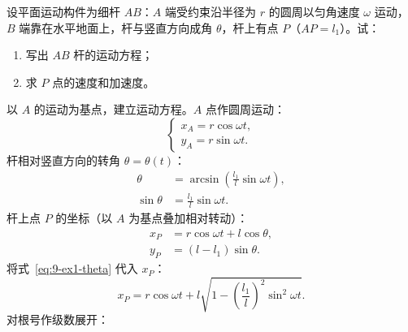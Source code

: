 \begin{example}
设平面运动构件为细杆 $AB$：$A$ 端受约束沿半径为 $r$ 的圆周以匀角速度 $\omega$ 运动，$B$ 端靠在水平地面上，杆与竖直方向成角 $\theta$，杆上有点 $P$（$AP=l_1$）。试：
\begin{enumerate}
  \item 写出 $AB$ 杆的运动方程；
  \item 求 $P$ 点的速度和加速度。
\end{enumerate}

\begin{solution}
以 $A$ 的运动为基点，建立运动方程。$A$ 点作圆周运动：
\begin{equation}\label{eq:9-ex1-A}
  \begin{cases}
    x_A = r\cos\omega t,\\
    y_A = r\sin\omega t.
  \end{cases}
\end{equation}
杆相对竖直方向的转角 $\theta=\theta(t)$：
\begin{equation}\label{eq:9-ex1-theta}
  \begin{aligned}
    \theta &= \arcsin\!\left(\frac{l_1}{l}\sin\omega t\right),\\
    \sin\theta &= \frac{l_1}{l}\sin\omega t.
  \end{aligned}
\end{equation}
杆上点 $P$ 的坐标（以 $A$ 为基点叠加相对转动）：
\begin{equation}\label{eq:9-ex1-P}
  \begin{aligned}
    x_P &= r\cos\omega t + l\cos\theta,\\
    y_P &= (l-l_1)\sin\theta.
  \end{aligned}
\end{equation}
将式~\eqref{eq:9-ex1-theta} 代入 $x_P$：
\begin{equation}\label{eq:9-ex1-Pexact}
  x_P = r\cos\omega t + l\sqrt{1-\left(\frac{l_1}{l}\right)^{2}\sin^{2}\omega t}.
\end{equation}
对根号作级数展开：
\begin{equation}\label{eq:9-ex1-series}

\end{equation}
\end{solution}
\end{example}
